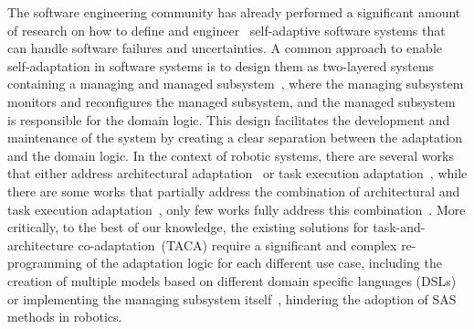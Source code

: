 
The software engineering community has already performed a significant amount of research on how to define and engineer~\cite{10.1145/1516533.1516538, krupitzer2015survey, 10.1145/3487921} self-adaptive software systems that can handle software failures and uncertainties. A common approach to enable self-adaptation in software systems is to design them as two-layered systems containing a managing and managed subsystem~\citep{weyns2020introduction}, where the managing subsystem monitors and reconfigures the managed subsystem, and the managed subsystem is responsible for the domain logic. This design facilitates the development and maintenance of the system by creating a clear separation between the adaptation and the domain logic. In the context of robotic systems, there are several works that either address architectural adaptation~\cite{peldszus2023softwarereconfigurationrobotics, ALBERTS2025112258} or task execution adaptation~\citep{carreno2021situation, hamilton2022towards}, while there are some works that partially address the combination of architectural and task execution adaptation~\cite{park2012task, runtime_variability_lotz, rra_nico, temoto}, only few works fully address this combination~\citep{braberman2018extended, CAMARASoftwareArchitectureTask2020}.
More critically, to the best of our knowledge, the existing solutions for task-and-architecture co-adaptation~(TACA) require a significant and complex re-programming of the adaptation logic for each different use case, including the creation of multiple models based on different domain specific languages (DSLs)~\citep{CAMARASoftwareArchitectureTask2020} or implementing the managing subsystem itself~\citep{braberman2018extended}, hindering the adoption of SAS methods in robotics.


